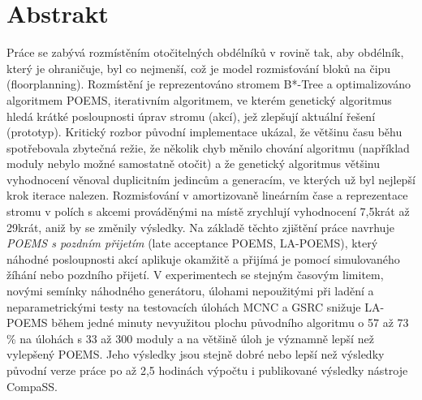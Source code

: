 \documentclass[11pt,twoside,a4paper]{book}
\begin{document}
\section*{Abstrakt}

Práce se zabývá rozmístěním otočitelných obdélníků v rovině tak, aby obdélník, který je ohraničuje, byl co nejmenší, což je model rozmisťování bloků na čipu (floorplanning). Rozmístění je reprezentováno stromem B*-Tree a optimalizováno algoritmem POEMS, iterativním algoritmem, ve kterém genetický algoritmus hledá krátké posloupnosti úprav stromu (akcí), jež zlepšují aktuální řešení (prototyp). Kritický rozbor původní implementace ukázal, že většinu času běhu spotřebovala zbytečná režie, že několik chyb měnilo chování algoritmu (například moduly nebylo možné samostatně otočit) a že genetický algoritmus většinu vyhodnocení věnoval duplicitním jedincům a generacím, ve kterých už byl nejlepší krok iterace nalezen. Rozmisťování v amortizovaně lineárním čase a reprezentace stromu v polích s akcemi prováděnými na místě zrychlují vyhodnocení 7,5krát až 29krát, aniž by se změnily výsledky. Na základě těchto zjištění práce navrhuje {\em POEMS s pozdním přijetím} (late acceptance POEMS, LA-POEMS), který náhodné posloupnosti akcí aplikuje okamžitě a přijímá je pomocí simulovaného žíhání nebo pozdního přijetí. V experimentech se stejným časovým limitem, novými semínky náhodného generátoru, úlohami nepoužitými při ladění a neparametrickými testy na testovacích úlohách MCNC a GSRC snižuje LA-POEMS během jedné minuty nevyužitou plochu původního algoritmu o 57 až 73\,\% na úlohách s 33 až 300 moduly a na většině úloh je významně lepší než vylepšený POEMS. Jeho výsledky jsou stejně dobré nebo lepší než výsledky původní verze práce po až 2,5 hodinách výpočtu i publikované výsledky nástroje CompaSS.


\cleardoublepage
\tableofcontents
\cleardoublepage
\listoffigures
\cleardoublepage
\listoftables


\cleardoublepage
\setcounter{page}{1}
\pagestyle{headings}







\appendix



\end{document}
